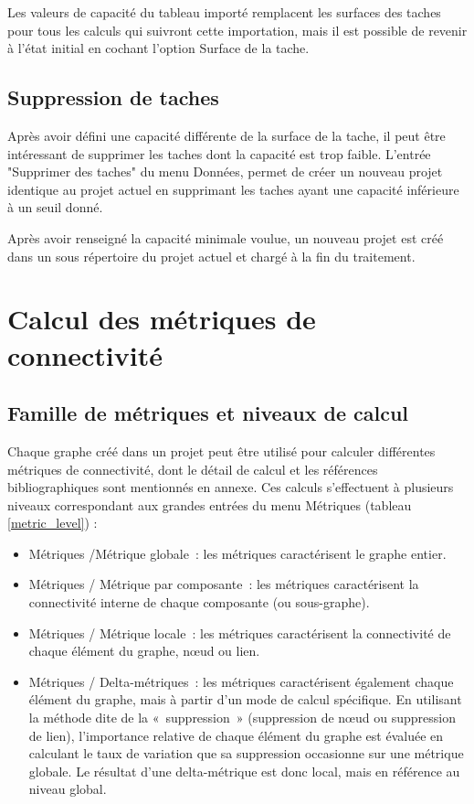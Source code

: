 \documentclass{article}
\begin{document}
Les valeurs de capacité du tableau importé remplacent les surfaces des taches pour tous les calculs qui suivront cette importation, mais il est possible de revenir à l’état initial en cochant l'option Surface de la tache.


\subsection{Suppression de taches}
Après avoir défini une capacité différente de la surface de la tache, il peut être intéressant de supprimer les taches dont la capacité est trop faible. L'entrée "Supprimer des taches" du menu Données, permet de créer un nouveau projet identique au projet actuel en supprimant les taches ayant une capacité inférieure à un seuil donné.

Après avoir renseigné la capacité minimale voulue, un nouveau projet est créé dans un sous répertoire du projet actuel et chargé à la fin du traitement.

\section{Calcul des métriques de connectivité}

\subsection{Famille de métriques et niveaux de calcul}

Chaque graphe créé dans un projet peut être utilisé pour calculer différentes métriques de connectivité, dont le détail de calcul et les références bibliographiques sont mentionnés en annexe. Ces calculs s’effectuent à plusieurs niveaux correspondant aux grandes entrées du menu Métriques (tableau \ref{metric_level}) :
\begin{itemize}
	\item Métriques /Métrique globale~: les métriques caractérisent le graphe entier.
	\item Métriques / Métrique par composante~: les métriques caractérisent la connectivité interne de chaque composante (ou sous-graphe).
	\item Métriques / Métrique locale~: les métriques caractérisent la connectivité de chaque élément du graphe, nœud ou lien.
	\item Métriques / Delta-métriques~: les métriques caractérisent également chaque élément du graphe, mais à partir d’un mode de calcul spécifique. En utilisant la méthode dite de la «~suppression~» (suppression de nœud ou suppression de lien), l’importance relative de chaque élément du graphe est évaluée en calculant le taux de variation que sa suppression occasionne sur une métrique globale. Le résultat d’une delta-métrique est donc local, mais en référence au niveau global.
\end{itemize}
\end{document}
